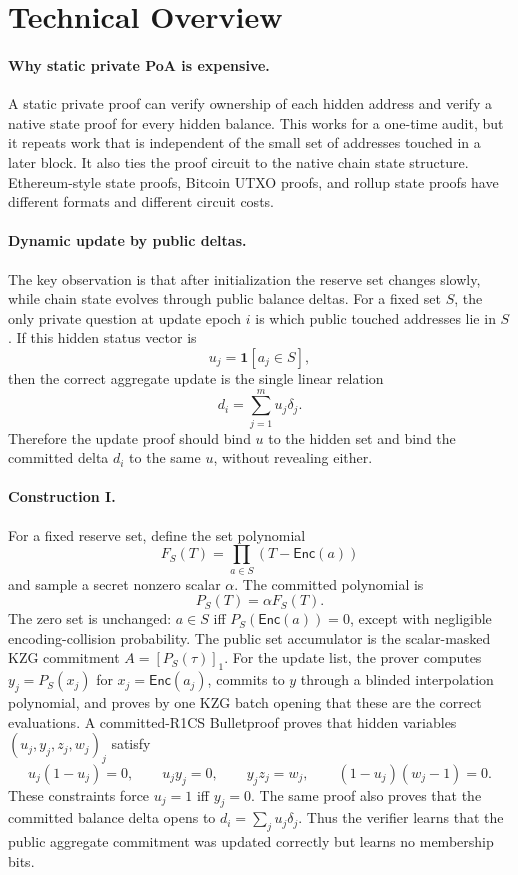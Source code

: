 \documentclass[runningheads]{llncs}
\newcommand{\Enc}{\mathsf{Enc}}
\begin{document}
\section{Technical Overview}

\paragraph{Why static private PoA is expensive.}
A static private proof can verify ownership of each hidden address and verify a native state proof for every hidden balance.  This works for a one-time audit, but it repeats work that is independent of the small set of addresses touched in a later block.  It also ties the proof circuit to the native chain state structure.  Ethereum-style state proofs, Bitcoin UTXO proofs, and rollup state proofs have different formats and different circuit costs.

\paragraph{Dynamic update by public deltas.}
The key observation is that after initialization the reserve set changes slowly, while chain state evolves through public balance deltas.  For a fixed set \(S\), the only private question at update epoch \(i\) is which public touched addresses lie in \(S\).  If this hidden status vector is
\[
        u_j=\mathbf{1}[a_j\in S],
\]
then the correct aggregate update is the single linear relation
\[
        d_i=\sum_{j=1}^m u_j\delta_j.
\]
Therefore the update proof should bind \(u\) to the hidden set and bind the committed delta \(d_i\) to the same \(u\), without revealing either.

\paragraph{Construction I.}
For a fixed reserve set, define the set polynomial
\[
        F_S(T)=\prod_{a\in S}(T-\Enc(a))
\]
and sample a secret nonzero scalar \(\alpha\).  The committed polynomial is
\[
        P_S(T)=\alpha F_S(T).
\]
The zero set is unchanged: \(a\in S\) iff \(P_S(\Enc(a))=0\), except with negligible encoding-collision probability.  The public set accumulator is the scalar-masked KZG commitment \(A=[P_S(\tau)]_1\).  For the update list, the prover computes \(y_j=P_S(x_j)\) for \(x_j=\Enc(a_j)\), commits to \(y\) through a blinded interpolation polynomial, and proves by one KZG batch opening that these are the correct evaluations.  A committed-R1CS Bulletproof proves that hidden variables \((u_j,y_j,z_j,w_j)_j\) satisfy
\[
 u_j(1-u_j)=0,\qquad u_jy_j=0,\qquad y_jz_j=w_j,\qquad (1-u_j)(w_j-1)=0.
\]
These constraints force \(u_j=1\) iff \(y_j=0\).  The same proof also proves that the committed balance delta opens to \(d_i=\sum_j u_j\delta_j\).  Thus the verifier learns that the public aggregate commitment was updated correctly but learns no membership bits.
\end{document}
